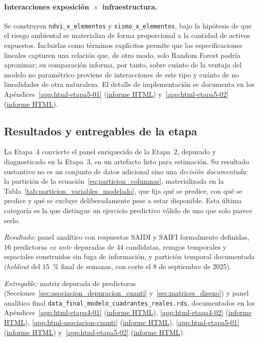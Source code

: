 \paragraph{Interacciones exposición~$\times$~infraestructura.} Se construyen \texttt{ndvi\_x\_elementos} y \texttt{sismo\_x\_elementos}, bajo la hipótesis de que el riesgo ambiental se materializa de forma proporcional a la cantidad de activos expuestos. Incluirlas como términos explícitos permite que las especificaciones lineales capturen una relación que, de otro modo, solo Random Forest podría aproximar; su comparación informa, por tanto, sobre cuánto de la ventaja del modelo no paramétrico proviene de interacciones de este tipo y cuánto de no linealidades de otra naturaleza. El detalle de implementación se documenta en los Apéndices~\ref{app:html-etapa5-01} (\href{\urlEtapaCincoUno}{informe HTML}) y~\ref{app:html-etapa5-02} (\href{\urlEtapaCincoDos}{informe HTML}).

\subsection{Resultados y entregables de la etapa}
\label{sec:resultados_etapa4}
La Etapa~4 convierte el panel enriquecido de la Etapa~2, depurado y diagnosticado en la Etapa~3, en un artefacto listo para estimación. Su resultado sustantivo no es un conjunto de datos adicional sino una \textit{decisión documentada}: la partición de la ecuación~\eqref{eq:particion_columnas}, materializada en la Tabla~\ref{tab:particion_variables_modelado}, que fija qué se predice, con qué se predice y qué se excluye deliberadamente pese a estar disponible. Esta última categoría es la que distingue un ejercicio predictivo válido de uno que solo parece serlo.

\textit{Resultado:} panel analítico con respuestas $\mathrm{SAIDI}$ y $\mathrm{SAIFI}$ formalmente definidas, $16$ predictoras \emph{ex ante} depuradas de $44$ candidatas, rezagos temporales y espaciales construidos sin fuga de información, y partición temporal documentada (\emph{holdout} del $15$~\% final de semanas, con corte el 8 de septiembre de 2025).

\textit{Entregable:} matriz depurada de predictoras (Secciones~\ref{sec:asociacion_depuracion_cuanti} y~\ref{sec:matrices_diseno}) y panel analítico final \texttt{data\_final\_modelo\_cuadrantes\_reales.rds}, documentados en los Apéndices~\ref{app:html-etapa4-01} (\href{\urlEtapaCuatroUno}{informe HTML}), \ref{app:html-etapa4-02} (\href{\urlEtapaCuatroDos}{informe HTML}), \ref{app:html-asociacion-cuanti} (\href{\urlasociaciondepuracioncuanti}{informe HTML}), \ref{app:html-etapa5-01} (\href{\urlEtapaCincoUno}{informe HTML}) y~\ref{app:html-etapa5-02} (\href{\urlEtapaCincoDos}{informe HTML}).

